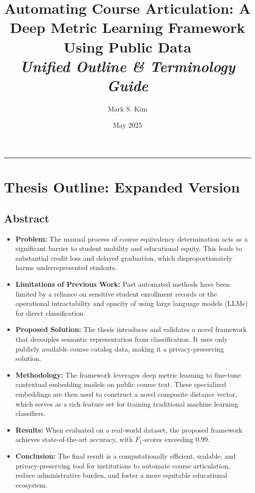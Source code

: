 \documentclass[11pt]{article}
\title{Automating Course Articulation: A Deep Metric Learning Framework Using Public Data \\ \vspace{0.5em} \large \textit{Unified Outline \& Terminology Guide}}
\author{Mark S. Kim}
\date{May 2025}
\begin{document}
\maketitle
\hrule
\vspace{2em}

\section*{Thesis Outline: Expanded Version}

\subsection*{Abstract}
\begin{itemize}
    \item \textbf{Problem:} The manual process of course equivalency determination acts as a significant barrier to student mobility and educational equity. This leads to substantial credit loss and delayed graduation, which disproportionately harms underrepresented students.
    \item \textbf{Limitations of Previous Work:} Past automated methods have been limited by a reliance on sensitive student enrollment records or the operational intractability and opacity of using large language models (LLMs) for direct classification.
    \item \textbf{Proposed Solution:} The thesis introduces and validates a novel framework that decouples semantic representation from classification. It uses only publicly available course catalog data, making it a privacy-preserving solution.
    \item \textbf{Methodology:} The framework leverages deep metric learning to fine-tune contextual embedding models on public course text. These specialized embeddings are then used to construct a novel composite distance vector, which serves as a rich feature set for training traditional machine learning classifiers.
    \item \textbf{Results:} When evaluated on a real-world dataset, the proposed framework achieves state-of-the-art accuracy, with $F_{1}$-scores exceeding 0.99.
    \item \textbf{Conclusion:} The final result is a computationally efficient, scalable, and privacy-preserving tool for institutions to automate course articulation, reduce administrative burden, and foster a more equitable educational ecosystem.
\end{itemize}
\end{document}
